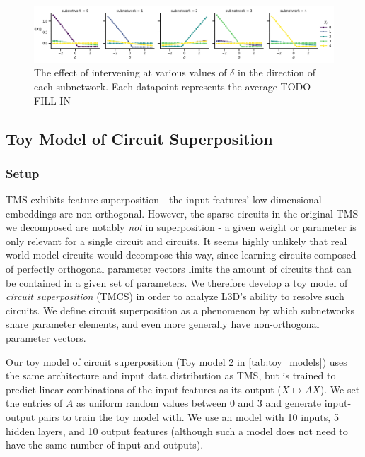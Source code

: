 \documentclass{article}
\theoremstyle{plain}
\theoremstyle{definition}
\theoremstyle{remark}
\begin{document}
\begin{figure}
    \centerline{\includegraphics[width=\columnwidth]{../figures/4_tms_intervention_mean.pdf}}
    \centering
    \caption{The effect of intervening at various values of $\delta$ in the direction of each subnetwork. Each datapoint represents the average TODO FILL IN}\label{fig:4_tms_intervention}
\end{figure}

\subsection{Toy Model of Circuit Superposition}

\subsubsection{Setup}

TMS exhibits feature superposition - the input features' low dimensional embeddings are non-orthogonal. However, the sparse circuits in the original TMS we decomposed are notably \textit{not} in superposition - a given weight or parameter is only relevant for a single circuit and circuits. It seems highly unlikely that real world model circuits would decompose this way, since learning circuits composed of perfectly orthogonal parameter vectors limits the amount of circuits that can be contained in a given set of parameters. We therefore develop a toy model of \textit{circuit superposition} (TMCS) in order to analyze L3D's ability to resolve such circuits. We define circuit superposition as a phenomenon by which subnetworks share parameter elements, and even more generally have non-orthogonal parameter vectors.

Our toy model of circuit superposition (Toy model 2 in \ref{tab:toy_models})  uses the same architecture and input data distribution as TMS, but is trained to predict linear combinations of the input features as its output ($X \mapsto A X$). We set the entries of $A$  as uniform random values between 0 and 3 and generate input-output pairs to train the toy model with. We use an model with 10 inputs, 5 hidden layers, and 10 output features (although such a model does not need to have the same number of input and outputs).
\end{document}
